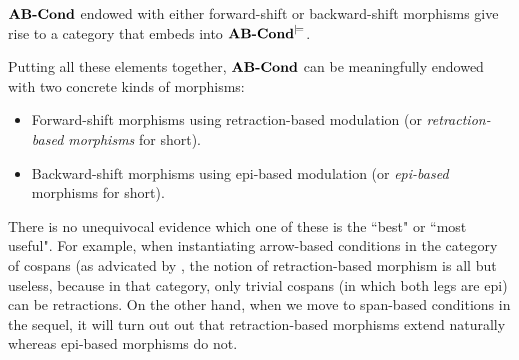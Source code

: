 \begin{proposition}
$\textbf{AB-Cond}$ endowed with either forward-shift or backward-shift morphisms give rise to a category that embeds into $\textbf{AB-Cond}^{\models}$.
\end{proposition}
%
Putting all these elements together, $\textbf{AB-Cond}$ can be meaningfully endowed with two concrete kinds of morphisms:

\begin{itemize}
\item Forward-shift morphisms using retraction-based modulation (or \emph{retraction-based morphisms} for short).
\item Backward-shift morphisms using epi-based modulation (or \emph{epi-based} morphisms for short).
\end{itemize}
%
There is no unequivocal evidence which one of these is the ``best" or ``most useful". For example, when instantiating arrow-based conditions in the category of cospans (as advicated by \cite{Koenig et al},  the notion of retraction-based morphism is all but useless, because in that category, only trivial cospans (in which both legs are epi) can be retractions. On the other hand, when we move to span-based conditions in the sequel, it will turn out out that retraction-based morphisms extend naturally whereas epi-based morphisms do not.

